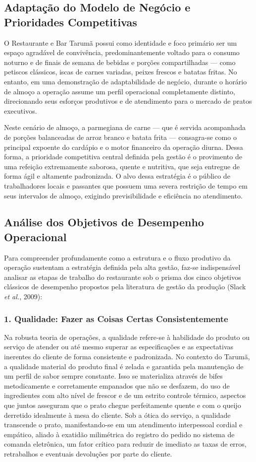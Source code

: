 \documentclass[12pt, a4paper]{article}
\begin{document}
\subsection{Adaptação do Modelo de Negócio e Prioridades Competitivas}
O Restaurante e Bar Tarumã possui como identidade e foco primário ser um espaço agradável de convivência, predominantemente voltado para o consumo noturno e de finais de semana de bebidas e porções compartilhadas --- como petiscos clássicos, iscas de carnes variadas, peixes frescos e batatas fritas. No entanto, em uma demonstração de adaptabilidade de negócio, durante o horário de almoço a operação assume um perfil operacional completamente distinto, direcionando seus esforços produtivos e de atendimento para o mercado de pratos executivos.

Neste cenário de almoço, a parmegiana de carne --- que é servida acompanhada de porções balanceadas de arroz branco e batata frita --- consagra-se como o principal expoente do cardápio e o motor financeiro da operação diurna. Dessa forma, a prioridade competitiva central definida pela gestão é o provimento de uma refeição extremamente saborosa, quente e nutritiva, que seja entregue de forma ágil e altamente padronizada. O alvo dessa estratégia é o público de trabalhadores locais e passantes que possuem uma severa restrição de tempo em seus intervalos de almoço, exigindo previsibilidade e eficiência no atendimento.

\subsection{Análise dos Objetivos de Desempenho Operacional}
Para compreender profundamente como a estrutura e o fluxo produtivo da operação sustentam a estratégia definida pela alta gestão, faz-se indispensável analisar as etapas de trabalho do restaurante sob o prisma dos cinco objetivos clássicos de desempenho propostos pela literatura de gestão da produção (Slack \textit{et al.}, 2009):

\subsubsection*{1. Qualidade: Fazer as Coisas Certas Consistentemente}
Na robusta teoria de operações, a qualidade refere-se à habilidade do produto ou serviço de atender ou até mesmo superar as especificações e as expectativas inerentes do cliente de forma consistente e padronizada. No contexto do Tarumã, a qualidade material do produto final é zelada e garantida pela manutenção de um perfil de sabor sempre constante. Isso se materializa através de bifes metodicamente e corretamente empanados que não se desfazem, do uso de ingredientes com alto nível de frescor e de um estrito controle térmico, aspectos que juntos asseguram que o prato chegue perfeitamente quente e com o queijo derretido idealmente à mesa do cliente. Sob a ótica do serviço, a qualidade transcende o prato, manifestando-se em um atendimento interpessoal cordial e empático, aliado à exatidão milimétrica do registro do pedido no sistema de comanda eletrônica, um fator crítico para reduzir de imediato as taxas de erros, retrabalhos e eventuais devoluções por parte do cliente.
\end{document}
